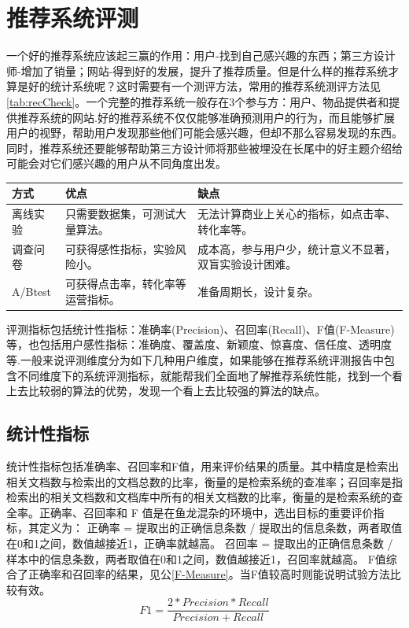 	\section{推荐系统评测}
		一个好的推荐系统应该起三赢的作用：用户-找到自己感兴趣的东西；第三方设计师-增加了销量；网站-得到好的发展，提升了推荐质量。但是什么样的推荐系统才算是好的统计系统呢？这时需要有一个测评方法，常用的推荐系统测评方法见\autoref{tab:recCheck}。一个完整的推荐系统一般存在3个参与方：用户、物品提供者和提供推荐系统的网站.好的推荐系统不仅仅能够准确预测用户的行为，而且能够扩展用户的视野，帮助用户发现那些他们可能会感兴趣，但却不那么容易发现的东西。同时，推荐系统还要能够帮助第三方设计师将那些被埋没在长尾中的好主题介绍给可能会对它们感兴趣的用户从不同角度出发。
		\begin{table}[htp]
		\centering
		\label{tab:recCheck}
		\begin{tabular}{|l|l|p{5cm}|} \hline
		 方式 & 优点 & 缺点 \\ \hline
		 离线实验 & 只需要数据集，可测试大量算法。 & 无法计算商业上关心的指标，如点击率、转化率等。 \\ \hline
		 调查问卷 & 可获得感性指标，实验风险小。 & 成本高，参与用户少，统计意义不显著，双盲实验设计困难。 \\ \hline
		 A/Btest & 可获得点击率，转化率等运营指标。& 准备周期长，设计复杂。 \\ \hline
		\end{tabular}
		\end{table}


		评测指标包括统计性指标：准确率(Precision)、召回率(Recall)、F值(F-Measure)等，也包括用户感性指标：准确度、覆盖度、新颖度、惊喜度、信任度、透明度等.一般来说评测维度分为如下几种用户维度，如果能够在推荐系统评测报告中包含不同维度下的系统评测指标，就能帮我们全面地了解推荐系统性能，找到一个看上去比较弱的算法的优势，发现一个看上去比较强的算法的缺点。

		\subsection{统计性指标}
			统计性指标包括准确率、召回率和F值，用来评价结果的质量。其中精度是检索出相关文档数与检索出的文档总数的比率，衡量的是检索系统的查准率；召回率是指检索出的相关文档数和文档库中所有的相关文档数的比率，衡量的是检索系统的查全率。正确率、召回率和 F 值是在鱼龙混杂的环境中，选出目标的重要评价指标，其定义为：
			正确率 = 提取出的正确信息条数 /  提取出的信息条数，两者取值在0和1之间，数值越接近1，正确率就越高。
			召回率 = 提取出的正确信息条数 /  样本中的信息条数，两者取值在0和1之间，数值越接近1，召回率就越高。
			F值综合了正确率和召回率的结果，见公\autoref{F-Measure}。当F值较高时则能说明试验方法比较有效。
			\begin{equation}
				F1 = \frac{2*Precision*Recall}{Precision+Recall}
				\label{F-Measure}
			\end{equation}

